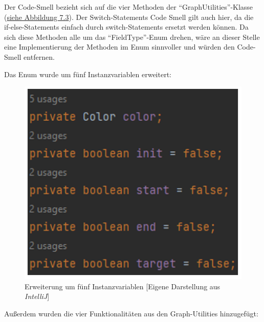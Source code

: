 \noindent Der Code-Smell bezieht sich auf die vier Methoden der \enquote{GraphUtilities}-Klasse (\hyperref[fig:graphutilities]{siehe Abbildung 7.3}). Der Switch-Statements Code Smell gilt auch hier, da die if-else-Statements einfach durch switch-Statements ersetzt werden können. Da sich diese Methoden alle um das \enquote{FieldType}-Enum drehen, wäre an dieser Stelle eine Implementierung der Methoden im Enum sinnvoller und würden den Code-Smell entfernen. 

\newpage
\noindent Das Enum wurde um fünf Instanzvariablen erweitert:

\begin{figure}[htbp]
\centering
\centerline{\includegraphics[scale=.55]{instanzvariablen}}
\caption{Erweiterung um fünf Instanzvariablen [Eigene Darstellung aus \emph{IntelliJ}]}
\label{fig:instanzvariablen}
\end{figure}

\noindent Außerdem wurden die vier Funktionalitäten aus den Graph-Utilities hinzugefügt:

